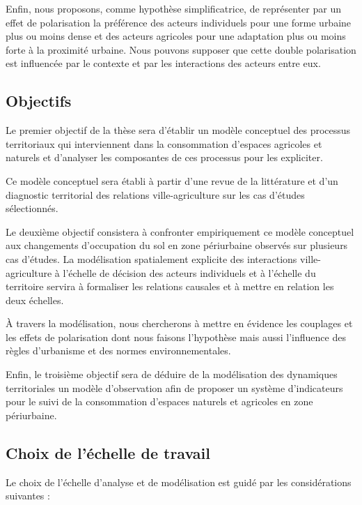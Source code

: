 Enfin, nous proposons, comme hypothèse simplificatrice,
de représenter par un effet de polarisation la préférence
des acteurs individuels pour une forme urbaine plus ou moins dense
et des acteurs agricoles pour une adaptation plus ou moins forte
à la proximité urbaine. Nous pouvons supposer que
cette double polarisation est influencée
par le contexte et par les interactions des acteurs entre eux.

	


\subsection{Objectifs}

Le premier objectif de la thèse sera d'établir
un modèle conceptuel des processus territoriaux
qui interviennent dans la consommation d'espaces agricoles et naturels
et d'analyser les composantes de ces processus pour les expliciter.

Ce modèle conceptuel sera établi à partir d'une revue de la littérature
et d'un diagnostic territorial des relations ville-agriculture
sur les cas d'études sélectionnés.

Le deuxième objectif consistera à confronter empiriquement
ce modèle conceptuel aux changements d'occupation
du sol en zone périurbaine observés sur plusieurs cas d'études.
La modélisation spatialement explicite des interactions ville-agriculture
à l'échelle de décision des acteurs individuels
et à l'échelle du territoire servira à formaliser les relations causales
et à mettre en relation les deux échelles.

À travers la modélisation, nous chercherons à mettre en évidence
les couplages et les effets de polarisation dont nous faisons l'hypothèse
mais aussi l'influence des règles d'urbanisme et des normes environnementales.

Enfin, le troisième objectif sera de déduire de la modélisation
des dynamiques territoriales un modèle
d'observation afin de proposer un système d'indicateurs
pour le suivi de la consommation d'espaces naturels et agricoles
en zone périurbaine.


\subsection{Choix de l'échelle de travail}

Le choix de l'échelle d'analyse et de modélisation est guidé
par les considérations suivantes :

